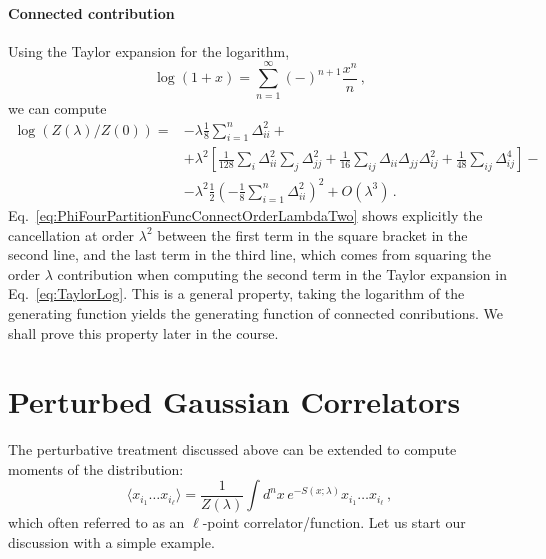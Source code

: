 \paragraph{Connected contribution}

Using the Taylor expansion for the logarithm,
\begin{equation}
  \label{eq:TaylorLog}
  \log(1+x) = \sum_{n=1}^\infty (-)^{n+1} \frac{x^n}{n}\, ,
\end{equation}
we can compute
\begin{align}
  \label{eq:PhiFourPartitionFuncConnectOrderLambdaTwo}
  \log\left(Z(\lambda)/Z(0)\right) = 
                    &- \lambda \frac{1}{8} \sum_{i=1}^n \Delta_{ii}^2
                                     +\nonumber \\
                     &+\lambda^2
                    \left[
                    \frac{1}{128} \sum_i \Delta_{ii}^2 \sum_j \Delta_{jj}^2 +
                    \frac{1}{16} \sum_{ij} \Delta_{ii} \Delta_{jj} \Delta_{ij}^2 +
                    \frac{1}{48} \sum_{ij} \Delta_{ij}^4
                    \right] -  \nonumber \\
  &- \lambda^2 \frac{1}{2} \left( - \frac{1}{8}
    \sum_{i=1}^n \Delta_{ii}^2\right)^2 +  O(\lambda^3)\, . 
\end{align}
Eq.~\ref{eq:PhiFourPartitionFuncConnectOrderLambdaTwo} shows
explicitly the cancellation at order $\lambda^2$ between the first
term in the square bracket in the second line, and the last term in
the third line, which comes from squaring the order $\lambda$
contribution when computing the second term in the Taylor expansion in
Eq.~\ref{eq:TaylorLog}. This is a general property, taking the
logarithm of the generating function yields the generating function of
connected conributions. We shall prove this property later in the
course. 

\section{Perturbed Gaussian Correlators}
\label{sec:pert-gauss-corr}

The perturbative treatment discussed above can be extended to compute
moments of the distribution:
\begin{equation}
  \label{eq:lPointCorrPert}
  \langle x_{i_1} \ldots x_{i_\ell}\rangle =
  \frac{1}{Z(\lambda)} 
  \int d^nx\, e^{-S(x;\lambda)} x_{i_1} \ldots x_{i_\ell}\, ,
\end{equation}
which often referred to as an $\ell$-point correlator/function. Let us start
our discussion with a simple example. 

